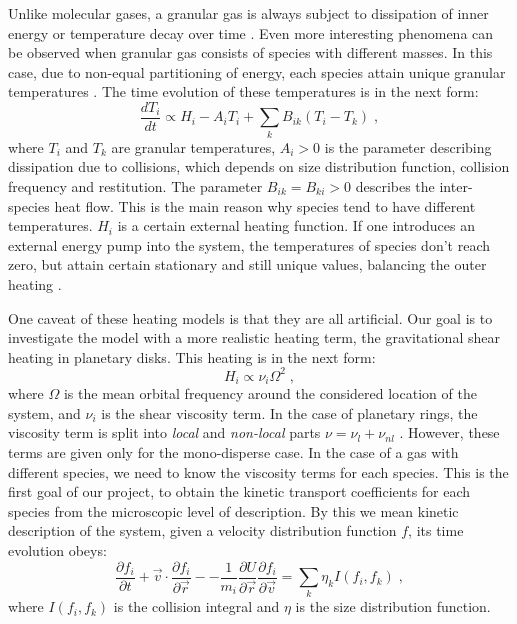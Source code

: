 \documentclass[11pt, notitlepage]{article} %
\begin{document}
Unlike molecular gases, a granular gas is always subject to dissipation of inner 
energy or temperature decay over time \cite{Haff1983,Brilliantov2004}. Even more interesting phenomena can be
observed when granular gas consists of species with different masses. In this case, 
due to non-equal partitioning of energy, each species attain unique granular 
temperatures \cite{Garzo2007c,Osinsky2020}. 
The time evolution of these temperatures is in the next form:
\begin{equation}
	\frac{dT_i}{dt} \propto H_i -A_iT_i+\sum_{k}B_{ik}(T_i-T_k)\;,
\end{equation}
where $T_i$ and $T_k$ are granular temperatures, $A_i>0$ is the parameter describing 
dissipation due to collisions, which depends on size distribution function, collision 
frequency and restitution. The parameter $B_{ik}=B_{ki}>0$ describes the inter-species 
heat flow. This is the main reason why species tend to have different temperatures. 
$H_i$ is a certain external heating function. If one introduces an external energy pump 
into the system, the temperatures of species don't reach zero, but attain certain 
stationary and still unique values, balancing the outer heating \cite{Bodrova2014}. 

One caveat of these heating models is that they are all artificial. Our goal 
is to investigate the model with a more realistic heating term, the gravitational 
shear heating in planetary disks. This heating is in the next form:
\begin{equation}
	H_i \propto \nu_i\Omega^2\;,
\end{equation}
where $\Omega$ is the mean orbital frequency around the considered location of the system,
and $\nu_i$ is the shear viscosity term. In the case of planetary rings, the viscosity
term is split into \emph{local} and \emph{non-local} parts $\nu=\nu_l+\nu_{nl}$ \cite{Seiss2011,Spahn2006,Stewart1984}.
However, these terms are given only for the mono-disperse case. In the case of a gas 
with different species, we need to know the viscosity terms for each species. 
This is the first goal of our project, to obtain the kinetic transport coefficients
for each species from the microscopic level of description. 
By this we mean kinetic description of the system, given a velocity distribution 
function $f$, its time evolution obeys:
\begin{equation}
	\frac{\partial f_i}{\partial t}+\vec{v}\cdot\frac{\partial f_i}{\partial\vec{r}}-
	-\frac{1}{m_i}\frac{\partial U}{\partial\vec{r}}\frac{\partial f_i}{\partial\vec{v}}=
	\sum_k\eta_kI(f_i,f_k)\;,
\end{equation}
where $I(f_i, f_k)$ is the collision integral and $\eta$ is the size distribution 
function.
\end{document}
